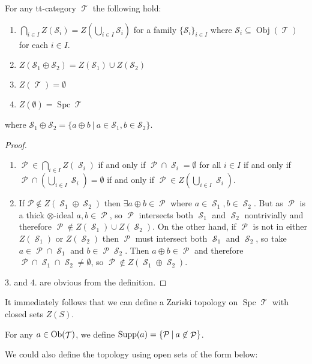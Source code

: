 \documentclass[11pt]{article}
\DeclareMathOperator{\CS}{\mathcal{S}}
\DeclareMathOperator{\cS}{\mathcal{S}}
\DeclareMathOperator{\ob}{Obj}
\DeclareMathOperator{\TT}{\mathcal{T}}
\DeclareMathOperator{\cP}{\mathcal{P}}
\DeclareMathOperator{\spc}{Spc}
\begin{document}
\begin{prop}
For any tt-category $\TT$ the following hold:
\begin{enumerate}[1.]
	\item $\bigcap_{i \in I}Z(\mathcal{S}_i) = Z(\bigcup_{i \in I}\mathcal{S}_i)$ for a family $\{\mathcal{S}_i\}_{i \in I}$ where $\mathcal{S}_i \subseteq \ob(\TT)$ for each $i \in I$.
	\item $Z(\mathcal{S}_1 \oplus \mathcal{S}_2) = Z(\mathcal{S}_1) \cup Z(\mathcal{S}_2)$ 
	\item $Z(\TT) = \emptyset$
	\item $Z(\emptyset) = \spc \TT$
\end{enumerate}
where $\mathcal{S}_1 \oplus \mathcal{S}_2 = \{a \oplus b\:|\: a \in \mathcal{S}_1, b \in \mathcal{S}_2\}$.
\end{prop}
\begin{proof}
\

\begin{enumerate}[1.]
	\item  $\cP \in \bigcap_{i \in I}Z(\cS_i)$ if and only if $\cP \cap \cS_i = \emptyset$ for all $i \in I$ if and only if $\cP \cap \left(\bigcup_{i \in I}\cS_i \right) = \emptyset $ if and only if $\cP \in Z(\bigcup_{i \in I}\cS_i)$.
	\item If $\mathcal{P} \not\in Z(\CS_1 \oplus \CS_2)$ then $\exists a \oplus b \in \cP$ where $a \in \CS_1,b \in \CS_2$. But as $\cP$ is a thick $\otimes$-ideal $a,b \in \cP$, so $\cP$ intersects both $\CS_1$ and $\CS_2$ nontrivially and therefore $\cP \not\in Z(\CS_1) \cup Z(\CS_2)$. On the other hand, if $\cP$ is not in either $Z(\CS_1)$ or $Z(\CS_2)$ then $\cP$ must intersect both $\CS_1$ and $\CS_2$, so take $a \in \cP \cap \CS_1$ and $b \in \cP \CS_2$. Then $a \oplus b \in \cP$ and therefore $\cP \cap \CS_1 \cap \CS_2 \not = \emptyset$, so $\cP \not\in Z(\CS_1 \oplus \CS_2)$.
\end{enumerate}
3. and 4. are obvious from the definition.
\end{proof}

It immediately follows that we can define a Zariski topology on $\spc \TT$ with closed sets $Z(S)$.

\begin{defn}
For any $a \in \Ob(\TT)$, we define $\Supp(a) = \{\mathcal{P}\:|\: a \not\in \cP\}$.
\end{defn}

We could also define the topology using open sets of the form below:
\end{document}
